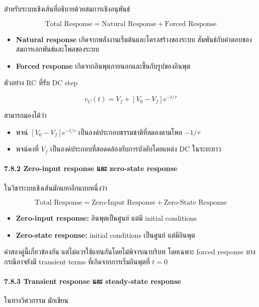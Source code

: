 สำหรับระบบเชิงเส้นที่อธิบายด้วยสมการเชิงอนุพันธ์

\[
\text{Total Response}=\text{Natural Response}+\text{Forced Response}
\]

\begin{itemize}
    \item \textbf{Natural response} เกิดจากพลังงานเริ่มต้นและโครงสร้างของระบบ สัมพันธ์กับคำตอบของสมการเอกพันธ์และโพลของระบบ
    \item \textbf{Forced response} เกิดจากอินพุตภายนอกและขึ้นกับรูปของอินพุต
\end{itemize}

ตัวอย่าง RC ที่รับ DC step

\[
v_C(t)=V_f+[V_0-V_f]e^{-t/\tau}
\]

สามารถมองได้ว่า

\begin{itemize}
    \item พจน์ $[V_0-V_f]e^{-t/\tau}$ เป็นองค์ประกอบธรรมชาติที่ลดลงตามโพล $-1/\tau$
    \item พจน์คงที่ $V_f$ เป็นองค์ประกอบที่สอดคล้องกับการบังคับโดยแหล่ง DC ในระยะยาว
\end{itemize}

\paragraph{7.8.2 Zero-input response และ zero-state response}

ในวิชาระบบเชิงเส้นมักแยกอีกแบบหนึ่งว่า

\[
\text{Total Response}=\text{Zero-Input Response}+\text{Zero-State Response}
\]

\begin{itemize}
    \item \textbf{Zero-input response:} อินพุตเป็นศูนย์ แต่มี initial conditions
    \item \textbf{Zero-state response:} initial conditions เป็นศูนย์ แต่มีอินพุต
\end{itemize}

คำสองคู่นี้เกี่ยวข้องกัน แต่ไม่ควรใช้แทนกันโดยไม่พิจารณาบริบท โดยเฉพาะ forced response บางกรณีอาจยังมี transient terms ที่เกิดจากการเริ่มอินพุตที่ $t=0$

\paragraph{7.8.3 Transient response และ steady-state response}

ในทางวิศวกรรม มักเขียน


